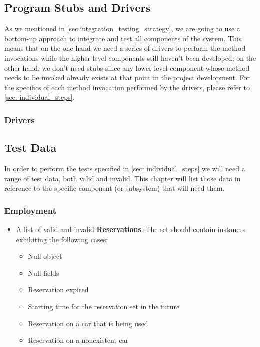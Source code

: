 	\subsection{Program Stubs and Drivers}
	
	As we mentioned in \autoref{sec:integration_testing_strategy}, we are going to use a bottom-up approach to integrate and test all components of the system. This means that on the one hand we need a series of drivers to perform the method invocations while the higher-level components still haven't been developed; on the other hand, we don't need stubs since any lower-level component whose method needs to be invoked already exists at that point in the project development. For the specifics of each method invocation performed by the drivers, please refer to \autoref{sec: individual_steps}.
		
		\subsubsection{Drivers}
		
	
	
	
	\subsection{Test Data}
	
	In order to perform the tests specified in \autoref{sec: individual_steps} we will need a range of test data, both valid and invalid. This chapter will list those data in reference to the specific component (or subsystem) that will need them. %
	
	
	
		\subsubsection{Employment}
		
		\begin{itemize}
			\item A list of valid and invalid \textbf{Reservations}. The set should contain instances exhibiting the following cases:
				\begin{itemize}
					\item Null object
					\item Null fields
					\item Reservation expired
					\item Starting time for the reservation set in the future
					\item Reservation on a car that is being used
					\item Reservation on a nonexistent car
				\end{itemize}
		\end{itemize}
		
